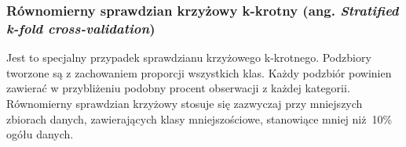 \subsubsection{Równomierny sprawdzian krzyżowy k-krotny (ang. \textit{Stratified k-fold cross-validation})}
Jest to specjalny przypadek sprawdzianu krzyżowego k-krotnego. Podzbiory tworzone są z zachowaniem proporcji wszystkich klas. Każdy podzbiór powinien zawierać w przybliżeniu podobny procent obserwacji z każdej kategorii. Równomierny sprawdzian krzyżowy stosuje się zazwyczaj przy mniejszych zbiorach danych, zawierających klasy mniejszościowe, stanowiące mniej niż 10\% ogółu danych.








